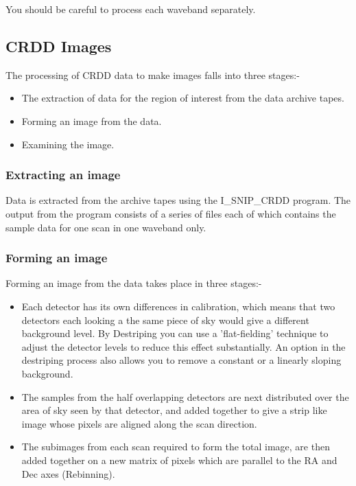 You should be careful to process each waveband separately.

\subsection{CRDD Images}

The processing of CRDD data to make images falls into three stages:- 
\begin{itemize}
\item The extraction of data for the region of interest from the data archive
tapes.
\item Forming an image from the data.
\item Examining the image.
\end{itemize}

\subsubsection{Extracting an image}

Data is extracted from the archive tapes using the I\_SNIP\_CRDD program.
The output from the program consists of a series of files each of which 
contains the sample data for one scan in one waveband only.

\subsubsection{Forming an image}

Forming an image from the data takes place in three stages:-
\begin{itemize}
\item Each detector has its own differences in calibration, which means that two
detectors each looking a the same piece of sky would give a different background
level. By Destriping you can use a 'flat-fielding' technique  to adjust the
detector levels to reduce this effect substantially. An option in the
destriping process also allows you to remove a constant or a linearly sloping
background.
\item The samples from the half overlapping detectors are next distributed over
the area of sky seen by that detector, and added together to give a strip
like image whose pixels are aligned along the scan direction.
\item The subimages from each scan required to form the total image, are then
added together on a new matrix of pixels which are parallel to the RA and Dec
axes (Rebinning).
\end{itemize}

